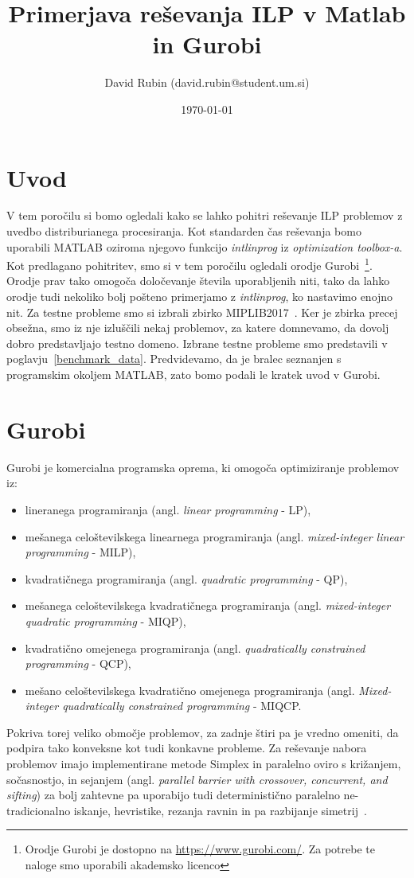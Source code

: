 \documentclass[a4paper,11pt]{article}
\title{Primerjava reševanja ILP v Matlab in Gurobi}
\author{David Rubin (david.rubin@student.um.si)}
\date{\today}
\begin{document}
\maketitle

\section{Uvod}

V tem poročilu si bomo ogledali kako se lahko pohitri reševanje ILP problemov z uvedbo distriburianega procesiranja. Kot standarden čas reševanja bomo uporabili MATLAB oziroma njegovo funkcijo \textit{intlinprog} iz \textit{optimization toolbox-a}.  Kot predlagano pohitritev, smo si v tem poročilu ogledali orodje Gurobi~\footnote{Orodje Gurobi je dostopno na \url{https://www.gurobi.com/}. Za potrebe te naloge smo uporabili akademsko licenco}. Orodje prav tako omogoča določevanje števila uporabljenih niti, tako da lahko orodje tudi nekoliko bolj pošteno primerjamo z \textit{intlinprog}, ko nastavimo enojno nit. Za testne probleme smo si izbrali zbirko MIPLIB2017~\cite{Miplib:2017}. Ker je zbirka precej obsežna, smo iz nje izluščili nekaj problemov, za katere domnevamo, da dovolj dobro predstavljajo testno domeno. Izbrane testne probleme smo predstavili v poglavju~\ref{benchmark_data}. Predvidevamo, da je bralec seznanjen s programskim okoljem MATLAB, zato bomo podali le kratek uvod v Gurobi.

\section{Gurobi}

Gurobi je komercialna programska oprema, ki omogoča optimiziranje problemov iz:
\begin{itemize}
\item lineranega programiranja (angl. \textit{linear programming} - LP),
\item mešanega celoštevilskega linearnega programiranja (angl. \textit{mixed-integer linear programming} - MILP),
\item kvadratičnega programiranja (angl. \textit{quadratic programming} - QP),
\item mešanega  celoštevilskega kvadratičnega programiranja (angl. \textit{mixed-integer quadratic programming} - MIQP),
\item kvadratično omejenega programiranja (angl. \textit{quadratically constrained programming} - QCP),
\item mešano celoštevilskega kvadratično omejenega programiranja (angl. \textit{Mixed-integer quadratically constrained programming} - MIQCP.
\end{itemize}
Pokriva torej veliko območje problemov, za zadnje štiri pa je vredno omeniti, da podpira tako konveksne kot tudi konkavne probleme. Za reševanje nabora problemov imajo implementirane metode Simplex in paralelno oviro s križanjem, sočasnostjo, in sejanjem (angl. \textit{parallel barrier with crossover, concurrent, and sifting}) za bolj zahtevne pa uporabijo tudi deterministično paralelno ne-tradicionalno iskanje, hevristike, rezanja ravnin in pa razbijanje simetrij~\cite{GurobiOptimizer:2020}. 	
\end{document}
